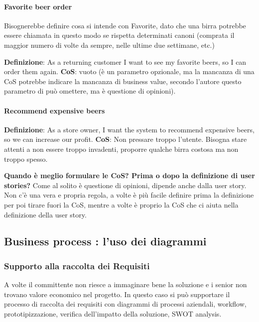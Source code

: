 \paragraph{Favorite beer order}
\begin{info}
	Bisognerebbe definire cosa si intende con Favorite, dato che una birra potrebbe essere chiamata in questo modo se rispetta determinati canoni (comprata il maggior numero di volte da sempre, nelle ultime due settimane, etc.)
\end{info}
\textbf{Definizione}: As a returning customer I want to see my favorite beers, so I can order them again.\newline
\textbf{CoS}: vuoto (è un parametro opzionale, ma la mancanza di una CoS potrebbe indicare la mancanza di business value, secondo l'autore questo parametro di può omettere, ma è questione di opinioni).\newline

\paragraph{Recommend expensive beers}
\textbf{Definizione}: As a store owner, I want the system to recommend expensive beers, so we can increase our profit.\newline
\textbf{CoS}: Non pressare troppo l'utente. Bisogna stare attenti a non essere troppo invadenti, proporre qualche birra costosa ma non troppo spesso. \newline

\begin{warn}
	\textbf{Quando è meglio formulare le CoS? Prima o dopo la definizione di user stories?}
	Come al solito è questione di opinioni, dipende anche dalla user story. Non c'è una vera e propria regola, a volte è più facile definire prima la definizione per poi tirare fuori la CoS, mentre a volte è proprio la CoS che ci aiuta nella definizione della user story.
\end{warn}

\subsection{Business process : l’uso dei diagrammi}
\subsubsection{Supporto alla raccolta dei Requisiti}
A volte il committente non riesce a immaginare bene la soluzione e i senior non trovano valore economico nel progetto. In questo caso si può supportare il processo di raccolta dei requisiti con diagrammi di processi aziendali, workflow, prototipizzazione, verifica dell'impatto della soluzione, SWOT analysis.
